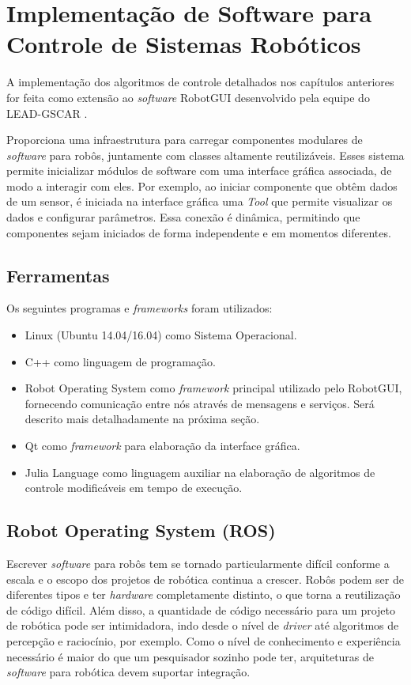 \chapter{Implementação de Software para Controle de Sistemas Robóticos}
A implementação dos algoritmos de controle detalhados nos capítulos anteriores for feita como extensão ao \textit{software} RobotGUI desenvolvido pela equipe do LEAD-GSCAR \citep{nunes2013doris}.

Proporciona uma infraestrutura para carregar componentes modulares de \textit{software} para robôs, juntamente com classes altamente reutilizáveis. Esses sistema permite inicializar módulos de software com uma interface gráfica associada, de modo a interagir com eles. Por exemplo, ao iniciar componente que obtêm dados de um sensor, é iniciada na interface gráfica uma \textit{Tool} que permite visualizar os dados e configurar parâmetros. Essa conexão é dinâmica, permitindo que componentes sejam iniciados de forma independente e em momentos diferentes.  


\section{Ferramentas}
Os seguintes programas e \textit{frameworks} foram utilizados:

\begin{itemize}
\item Linux (Ubuntu 14.04/16.04) como Sistema Operacional.
\item C++ como linguagem de programação.
\item Robot Operating System \citep{quigley2009ros} como \textit{framework} principal utilizado pelo RobotGUI, fornecendo comunicação entre nós através de mensagens e serviços. Será descrito mais detalhadamente na próxima seção.
\item Qt \citep{qtcompany} como \textit{framework} para elaboração da interface gráfica. 
\item Julia Language como linguagem auxiliar na elaboração de algoritmos de controle modificáveis em tempo de execução.
\end{itemize}

\section{Robot Operating System (ROS)}
Escrever \textit{software} para robôs tem se tornado particularmente difícil conforme a escala e o escopo dos projetos de robótica continua a crescer. Robôs podem ser de diferentes tipos e ter \textit{hardware} completamente distinto, o que torna a reutilização de código difícil. Além disso, a quantidade de código necessário para um projeto de robótica pode ser intimidadora, indo desde o nível de \textit{driver} até algoritmos de percepção e raciocínio, por exemplo. Como o nível de conhecimento e experiência necessário é maior do que um pesquisador sozinho pode ter, arquiteturas de \textit{software} para robótica devem suportar integração. 

